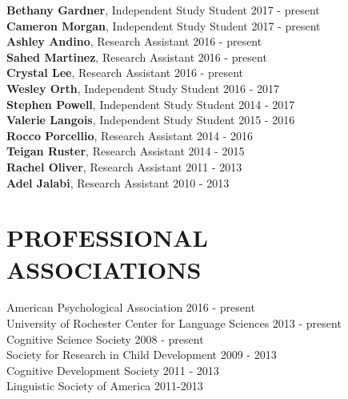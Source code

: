\documentclass[margin, 7pt]{res} %
\begin{document}
\begin{resume}
{\bf Bethany Gardner}, Independent Study Student	\hfill 2017 - present \\
{\bf Cameron Morgan}, Independent Study Student	\hfill 2017 - present \\
{\bf Ashley Andino}, Research Assistant	\hfill 2016 - present \\
{\bf Sahed Martinez}, Research Assistant	\hfill 2016 - present \\
{\bf Crystal Lee}, Research Assistant	\hfill 2016 - present \\
{\bf Wesley Orth}, Independent Study Student	\hfill 2016 - 2017 \\
{\bf Stephen Powell}, Independent Study Student	\hfill 2014 - 2017 \\
{\bf Valerie Langois}, Independent Study Student	\hfill 2015 - 2016 \\
{\bf Rocco Porcellio}, Research Assistant	\hfill 2014 - 2016 \\
{\bf Teigan Ruster}, Research Assistant	\hfill 2014 - 2015 \\
{\bf Rachel Oliver}, Research Assistant	\hfill 2011 - 2013 \\
{\bf Adel Jalabi}, Research Assistant	\hfill 2010 - 2013 \\


\section{PROFESSIONAL ASSOCIATIONS}

American Psychological Association \hfill 2016 - present \\
University of Rochester Center for Language Sciences	\hfill 2013 - present \\
Cognitive Science Society	\hfill 2008 - present \\ 
Society for Research in Child Development   	\hfill 2009 - 2013 \\
Cognitive Development Society	\hfill 2011 - 2013 \\
Linguistic Society of America   \hfill	 2011-2013 \\



\end{resume}
\end{document}
